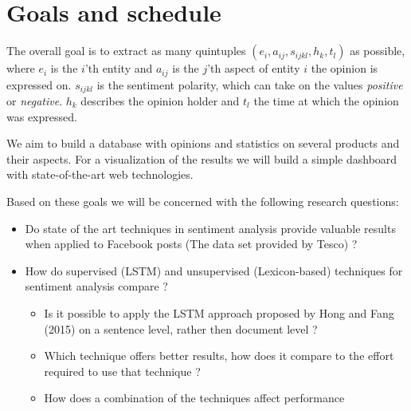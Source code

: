 \documentclass[10pt,a4paper]{article}
\begin{document}
	\section{Goals and schedule}
	The overall goal is to extract as many quintuples $(e_i, a_{ij}, s_{ijkl}, h_k, t_l)$ as possible, where $e_i$ is the $i$'th entity and $a_{ij}$ is the $j$'th aspect of entity $i$ the opinion is expressed on. $s_{ijkl}$ is the sentiment polarity, which can take on the values \textit{positive} or \textit{negative}. $h_k$ describes the opinion holder and $t_l$ the time at which the opinion was expressed.
	
	We aim to build a database with opinions and statistics on several products and their aspects. For a visualization of the results we will build a simple dashboard with state-of-the-art web technologies.

	Based on these goals we will be concerned with the following research questions:

	\begin{itemize}
	\item Do state of the art techniques in sentiment analysis provide valuable results when applied to Facebook posts (The data set provided by Tesco) ?
	\item How do supervised (LSTM) and unsupervised (Lexicon-based) techniques for sentiment analysis compare ?
	\begin{itemize}
	\item Is it possible to apply the LSTM approach proposed by Hong and Fang (2015) on a sentence level, rather then document level ?
	\item Which technique offers better results, how does it compare to the effort required to use that technique ?
	\item How does a combination of the techniques affect performance
	\end{itemize}
	\end{itemize}

	\newpage

	\nocite{DBLP:journals/corr/AndorAWSPGPC16}
	\nocite{Liu12sentimentanalysis}
	\nocite{Zhang2014}
	\nocite{pennington2014glove}
	\nocite{syntaxnet}
	\nocite{Ding:2008:HLA:1341531.1341561}
	\nocite{Hu:2004:MSC:1014052.1014073}
	\nocite{hongsentiment}

	
	
\end{document}
